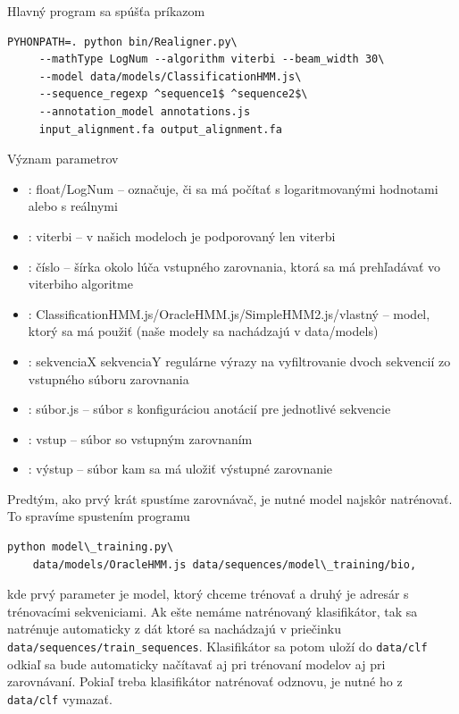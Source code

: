 Hlavný program sa spúšťa príkazom

\begin{verbatim}
PYHONPATH=. python bin/Realigner.py\
     --mathType LogNum --algorithm viterbi --beam_width 30\
     --model data/models/ClassificationHMM.js\
     --sequence_regexp ^sequence1$ ^sequence2$\
     --annotation_model annotations.js
     input_alignment.fa output_alignment.fa
\end{verbatim}

Význam parametrov
\begin{itemize}
    \item {}: float/LogNum -- označuje, či sa má počítať s logaritmovanými hodnotami alebo s reálnymi
    \item {}: viterbi -- v našich modeloch je podporovaný len viterbi
    \item {}: číslo -- šírka okolo lúča vstupného zarovnania, ktorá sa má prehľadávať vo viterbiho algoritme
    \item {}: ClassificationHMM.js/OracleHMM.js/SimpleHMM2.js/vlastný -- model, ktorý sa má použiť (naše modely sa nachádzajú v data/models)
    \item \method{sequence\_regexp}: sekvenciaX sekvenciaY regulárne výrazy na vyfiltrovanie dvoch sekvencií zo vstupného súboru zarovnania
    \item \method{annotation\_model}: súbor.js -- súbor s konfiguráciou anotácií pre jednotlivé sekvencie
    \item \method{1}: vstup -- súbor so vstupným zarovnaním
    \item \method{2}: výstup -- súbor kam sa má uložiť výstupné zarovnanie
\end{itemize}

Predtým, ako prvý krát spustíme zarovnávač, je nutné model najskôr natrénovať. To spravíme spustením programu
\begin{verbatim}
python model\_training.py\
    data/models/OracleHMM.js data/sequences/model\_training/bio,
\end{verbatim}
kde prvý parameter je model, ktorý chceme trénovať a druhý je adresár s trénovacími sekveniciami. Ak ešte nemáme natrénovaný klasifikátor, tak sa natrénuje automaticky z dát ktoré sa nachádzajú v priečinku {\tt data/sequences/train\_sequences}. Klasifikátor sa potom uloží do {\tt data/clf} odkiaľ sa bude automaticky načítavať aj pri trénovaní modelov aj pri zarovnávaní. Pokiaľ treba klasifikátor natrénovať odznovu, je nutné ho z {\tt data/clf} vymazať.

